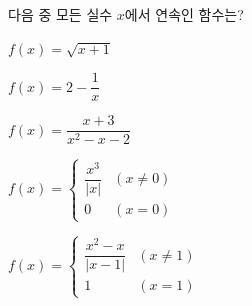 다음 중 모든 실수 $x$에서 연속인 함수는?
\begin{choicesii}{\rule[-3ex]{0pt}{8ex}$f(x)=\sqrt{x+1}$}{\rule[-3ex]{0pt}{8ex}$f(x)=2-\dfrac{1}{x}$}{\rule[-3ex]{0pt}{8ex}$f(x)=\dfrac{x+3}{x^2-x-2}$}{\rule[-3ex]{0pt}{8ex}$f(x)=\begin{cases} \dfrac{x^3}{|x|} & (x\ne 0) \\ 0 & (x=0) \end{cases}$}{\rule[-3ex]{0pt}{8ex}$f(x)=\begin{cases} \dfrac{x^2-x}{|x-1|} & (x\ne 1) \\ 1 & (x=1) \end{cases}$}\end{choicesii}
